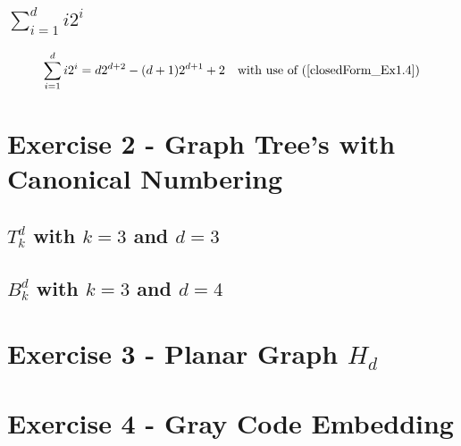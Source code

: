 \subsection{$\sum_{i=1}^d i2^i$}

\begin{equation}
    \begin{aligned}
        \sum_{i=1}^d i2^i = d  2^{d+2} - (d+1)2^{d+1} + 2 \quad \text{with use of (\ref{closedForm_Ex1.4})}
    \end{aligned}
\end{equation}

\pagebreak





\section{Exercise 2 - Graph Tree's with Canonical Numbering}
\subsection{$T^d_k$ with $k=3$ and $d=3$}


\subsection{$B^d_k$ with $k=3$ and $d=4$}

\section{Exercise 3 - Planar Graph $H_d$}

\section{Exercise 4 - Gray Code Embedding}
